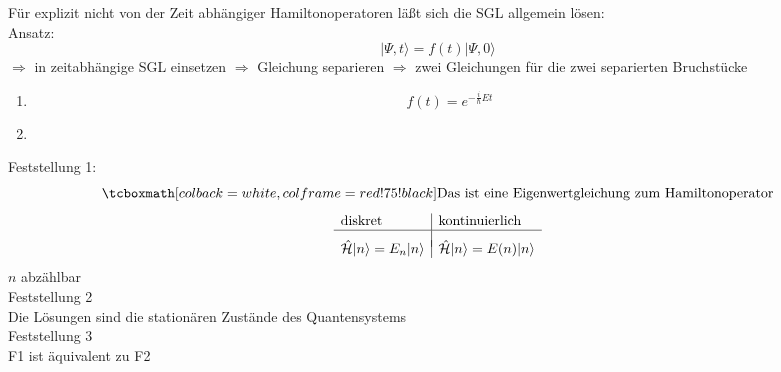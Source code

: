 Für explizit nicht von der Zeit abhängiger Hamiltonoperatoren läßt sich die SGL allgemein lösen:\\[5pt]
Ansatz:
\begin{equation*}
|\Psi,t\rangle = f(t) |\Psi,0\rangle
\end{equation*}
$ \Rightarrow $ in zeitabhängige SGL einsetzen $ \Rightarrow $ Gleichung separieren $ \Rightarrow $ zwei Gleichungen für die zwei separierten Bruchstücke
\begin{enumerate}[(1)]
	\item $$ f(t) = e^{-\frac{i}{\hbar} Et} $$
	\item$ \phantom{0} $\\[-30pt]
\end{enumerate}
Feststellung 1:
\begin{equation*}
\rmbox{\tx{Das ist eine Eigenwertgleichung zum Hamiltonoperator}}
\end{equation*}
\begin{equation*}
\begin{array}{l|l}
	\textrm{diskret} & \textrm{kontinuierlich}\\
	\hline\\[-5pt]
	\hat{\mathcal{H}} |n\rangle = E_n |n\rangle & \hat{\mathcal{H}} |n\rangle = E(n) |n\rangle\\
\end{array}
\end{equation*}
$ n $ abzählbar\\[5pt]
Feststellung 2\\
Die Lösungen sind die stationären Zustände des Quantensystems\\[5pt]
Feststellung 3\\
F1 ist äquivalent zu F2